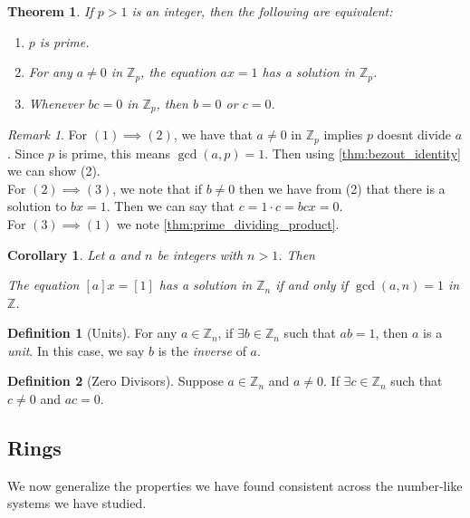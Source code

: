 \documentclass{article}
\newtheorem{theorem}{Theorem}[section]
\newtheorem{corollary}{Corollary}[section]
\theoremstyle{definition}
\newtheorem{definition}{Definition}[section]
\theoremstyle{remark}
\newtheorem{remark}{Remark}[section]
\begin{document}
\begin{theorem}\label{thm:prime congruence classes}
If $p > 1$ is an integer, then the following are equivalent:
\begin{enumerate}
\item $p$ is prime.
\item For any $a \neq 0$ in $\mathbb{Z}_p$, the equation $ax = 1$ has a solution in $\mathbb{Z}_p$.
\item Whenever $bc = 0$ in $\mathbb{Z}_p$, then $b = 0$ or $c = 0$.
\end{enumerate}
\end{theorem}

\begin{remark}
For $(1)\implies (2)$, we have that $a\neq 0$ in $\mathbb{Z}_p$ implies
$p$ doesnt divide $a$. Since $p$ is prime, this means $\gcd(a,p)=1$. Then using
\ref{thm:bezout_identity} we can show (2).\\
For $(2) \implies (3)$, we note that if $b \neq 0$ then we have 
from (2) that there is a solution to $bx = 1$. Then we can 
say that $c = 1\cdot c = bcx = 0$. \\
For $(3)\implies (1)$ we note \ref{thm:prime_dividing_product}.
\end{remark}




\begin{corollary}
Let $a$ and $n$ be integers with $n > 1$. Then

The equation $[a]x = [1]$ has a solution in $\mathbb{Z}_n$ if and only if $\gcd(a, n) = 1$ in $\mathbb{Z}$.
\end{corollary}


\begin{definition}[Units]\label{def:units}
For any $ a \in \mathbb{Z}_n$, if $ \exists b \in \mathbb{Z}_n$ such that $ab = 1$, then $a$ is a \textit{unit}. In this case, we say $b$ is the \textit{inverse} of $a$.
\end{definition}

\begin{definition}[Zero Divisors]\label{def:zero_divisor}
Suppose $a \in \mathbb{Z}_n$ and $ a \neq 0$. If  $ \exists c \in \mathbb{Z}_n$ such that $c \neq 0$ and $ac = 0$.
\end{definition}








\subsection{Rings}
\par We now generalize the properties we have found consistent across the number-like systems we have studied. 
\end{document}
